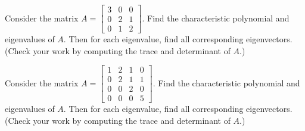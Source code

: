 \begin{problem}
Consider the matrix 
$
A=
\begin{bmatrix}
 3 & 0 & 0 \\
 0 & 2 & 1 \\
 0 & 1 & 2
\end{bmatrix}
$. 
Find the characteristic polynomial and eigenvalues of $A$. 
Then for each eigenvalue, find all corresponding eigenvectors.
(Check your work by computing the trace and determinant of $A$.)
\end{problem}



\begin{problem}
Consider the matrix 
$
A=
\begin{bmatrix}
 1 & 2 & 1 & 0 \\
 0 & 2 & 1 & 1 \\
 0 & 0 & 2 & 0 \\
 0 & 0 & 0 & 5
\end{bmatrix}
$. 
Find the characteristic polynomial and eigenvalues of $A$. 
Then for each eigenvalue, find all corresponding eigenvectors.
(Check your work by computing the trace and determinant of $A$.)
\end{problem}





